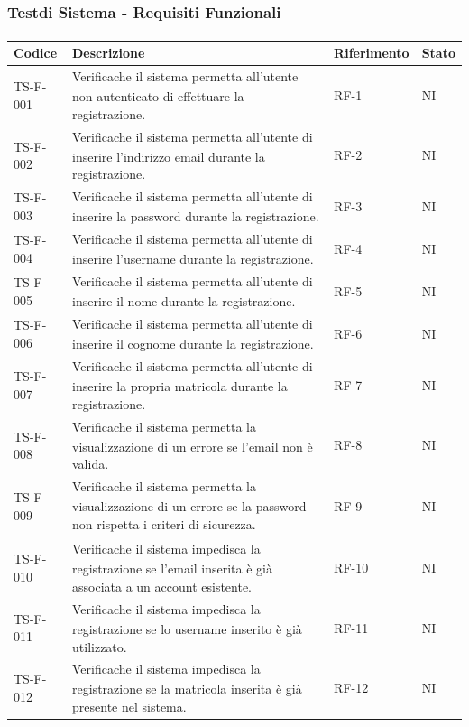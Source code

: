 \documentclass[a4paper,11pt]{article}
\renewcommand{\G}{\texorpdfstring{\textsubscript{\scalebox{0.6}{\textbf{G}}}\xspace}{ G}}
\begin{document}
\subsubsection{Test\G di Sistema - Requisiti Funzionali}
\begin{longtable}{|p{2.2cm}|p{8.3cm}|p{2cm}|p{1.5cm}|}
\hline
\rowcolor{primaryblue!30} 
\textbf{Codice} & \textbf{Descrizione} & \textbf{Riferimento} & \textbf{Stato} \\
\hline
\endhead

TS-F-001 & Verifica\G che il sistema permetta all'utente non autenticato di effettuare la registrazione. & RF-1 & NI \\ \hline
TS-F-002 & Verifica\G che il sistema permetta all'utente di inserire l'indirizzo email durante la registrazione. & RF-2 & NI \\ \hline
TS-F-003 & Verifica\G che il sistema permetta all'utente di inserire la password durante la registrazione. & RF-3 & NI \\ \hline
TS-F-004 & Verifica\G che il sistema permetta all'utente di inserire l'username durante la registrazione. & RF-4 & NI \\ \hline
TS-F-005 & Verifica\G che il sistema permetta all'utente di inserire il nome durante la registrazione. & RF-5 & NI \\ \hline
TS-F-006 & Verifica\G che il sistema permetta all'utente di inserire il cognome durante la registrazione. & RF-6 & NI \\ \hline
TS-F-007 & Verifica\G che il sistema permetta all'utente di inserire la propria matricola durante la registrazione. & RF-7 & NI \\ \hline
TS-F-008 & Verifica\G che il sistema permetta la visualizzazione di un errore se l'email non è valida. & RF-8 & NI \\ \hline
TS-F-009 & Verifica\G che il sistema permetta la visualizzazione di un errore se la password non rispetta i criteri di sicurezza\G. & RF-9 & NI \\ \hline
TS-F-010 & Verifica\G che il sistema impedisca la registrazione se
l’email inserita è già associata a un account
esistente. & RF-10 & NI \\ \hline
TS-F-011 & Verifica\G che il sistema impedisca la registrazione se
lo username inserito è già utilizzato. & RF-11 & NI \\ \hline
TS-F-012 & Verifica\G che il sistema impedisca la registrazione
se la matricola inserita è già presente nel
sistema. & RF-12 & NI \\ \hline

\end{longtable}
\end{document}
